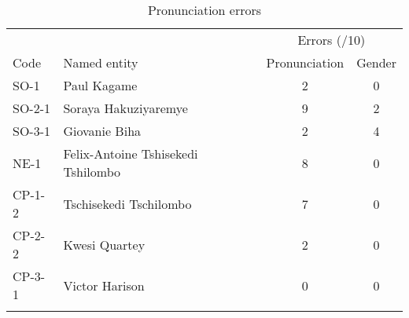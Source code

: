 \begin{table}
\begin{tabular}{ll cc}
\lsptoprule
     &              & \multicolumn{2}{c}{Errors (/10)}\\\cmidrule(lr){3-4}
Code & Named entity &  Pronunciation  &  Gender  \\ \midrule
SO-1    & Paul Kagame                          & 2   & 0  \\
SO-2-1  & Soraya Hakuziyaremye                 & 9   & 2  \\
SO-3-1  & Giovanie Biha                        & 2   & 4  \\
NE-1    & Felix-Antoine   Tshisekedi Tshilombo & 8   & 0  \\
CP-1-2  & Tschisekedi Tschilombo               & 7   & 0  \\
CP-2-2  & Kwesi Quartey                        & 2   & 0  \\
CP-3-1  & Victor Harison                       & 0   & 0  \\
\lspbottomrule
\end{tabular}
\caption{Pronunciation errors\label{tab:23}}
\end{table}

